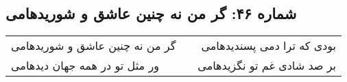 \begin{center}
\section*{شماره ۴۶: گر من نه چنین عاشق و شوریدهامی}
\label{sec:046}
\begin{longtable}{l p{0.5cm} r}
گر من نه چنین عاشق و شوریدهامی
&&
بودی که ترا دمی پسندیدهامی
\\
ور مثل تو در همه جهان دیدهامی
&&
بر صد شادی غم تو نگزیدهامی
\\
\end{longtable}
\end{center}

